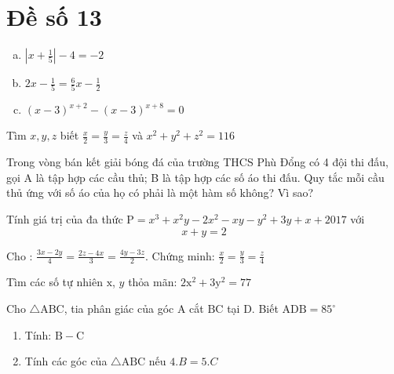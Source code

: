 \onehalfspacing
\section{Đề số 13}

\begin{bt} 
    \hfill
	\begin{enumerate}[a.]
		\item $\left|x+\frac{1}{5}\right|-4=-2$
        \item $2 x-\frac{1}{5}=\frac{6}{5} x-\frac{1}{2}$
        \item $(x-3)^{x+2}-(x-3)^{x+8}=0$
	\end{enumerate}
	\loigiai{} 
\end{bt}

\begin{bt}
	Tìm $x, y, z$ biết $\frac{x}{2}=\frac{y}{3}=\frac{z}{4}$ và $x^2+y^2+z^2=116$
	\loigiai{} 
\end{bt}

\begin{bt}
	Trong vòng bán kết giải bóng đá của trường THCS Phù Đổng có 4 đội thi đấu, gọi $\mathrm{A}$ là tập hợp các cầu thủ; B là tập hợp các số áo thi đấu. Quy tắc mỗi cầu thủ ứng với số áo của họ có phải là một hàm số không? Vì sao?
	\loigiai{}
\end{bt}

\begin{bt}
    Tính giá trị của đa thức $\mathrm{P}=x^3+x^2 y-2 x^2-x y-y^2+3 y+x+2017$ với
    $$
    x+y=2
    $$
\loigiai{}
\end{bt}

\begin{bt}
    Cho : $\frac{3 x-2 y}{4}=\frac{2 z-4 x}{3}=\frac{4 y-3 z}{2}$. Chứng minh: $\frac{x}{2}=\frac{y}{3}=\frac{z}{4}$
\loigiai{}
\end{bt}

\begin{bt}
    Tìm các số tự nhiên $\mathrm{x}$, $y$ thỏa mãn: $2 \mathrm{x}^2+3 \mathrm{y}^2=77$  
\loigiai{}
\end{bt}

\begin{bt}
    Cho $\triangle \mathrm{ABC}$, tia phân giác của góc $\mathrm{A}$ cắt $\mathrm{BC}$ tại $\mathrm{D}$. Biết $\mathrm{ADB}=85^{\circ}$
    \begin{enumerate}
        \item Tính: $\mathrm{B}-\mathrm{C}$
        \item Tính các góc của $\triangle \mathrm{ABC}$ nếu $4 . B=5 . C$
    \end{enumerate}
\loigiai{}
\end{bt}

